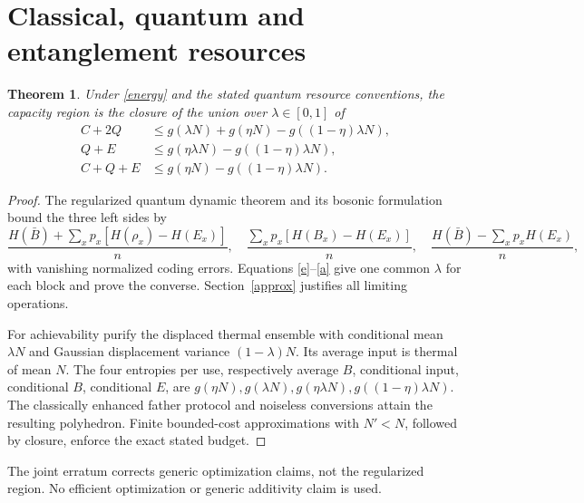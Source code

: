 \documentclass[11pt]{article}
\newtheorem{theorem}{Theorem}
\begin{document}
\section{Classical, quantum and entanglement resources}
\begin{theorem}\label{cqe}
Under \eqref{energy} and the stated quantum resource conventions, the
capacity region is the closure of the union over $\lambda\in[0,1]$ of
\begin{align}
 C+2Q&\le g(\lambda N)+g(\eta N)-g((1-\eta)\lambda N),\label{c1}\\
 Q+E&\le g(\eta\lambda N)-g((1-\eta)\lambda N),\label{c2}\\
 C+Q+E&\le g(\eta N)-g((1-\eta)\lambda N).\label{c3}
\end{align}
\end{theorem}
\begin{proof}
The regularized quantum dynamic theorem \cite{QDC} and its
bosonic formulation \cite[Proposition 1]{WHG} bound the three left
sides by
\[
 \frac{H(\bar B)+\sum_xp_x[H(\rho_x)-H(E_x)]}{n},\quad
 \frac{\sum_xp_x[H(B_x)-H(E_x)]}{n},\quad
 \frac{H(\bar B)-\sum_xp_xH(E_x)}{n},
\]
with vanishing normalized coding errors. Equations \eqref{e}--\eqref{a}
give one common $\lambda$ for each block and prove the converse.
Section~\ref{approx} justifies all limiting operations.

For achievability purify the displaced thermal ensemble with
conditional mean $\lambda N$ and Gaussian displacement variance
$(1-\lambda)N$. Its average input is thermal of mean $N$.
The four entropies per use, respectively average $B$, conditional
input, conditional $B$, conditional $E$, are
$g(\eta N),g(\lambda N),g(\eta\lambda N),g((1-\eta)\lambda N)$.
The classically enhanced father protocol and noiseless conversions
\cite{CEF,QDC,WHG} attain the resulting polyhedron. Finite
bounded-cost approximations with $N'<N$, followed by closure,
enforce the exact stated budget.
\end{proof}
The joint erratum \cite{ERR} corrects generic optimization claims,
not the regularized region. No efficient optimization or generic
additivity claim is used.
\end{document}
